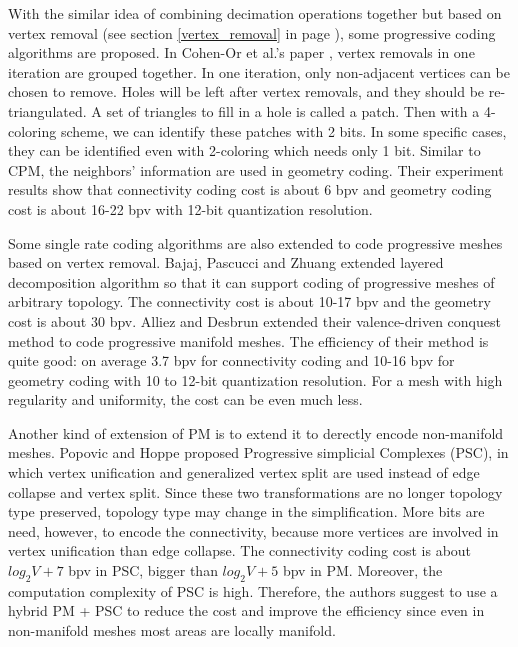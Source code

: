 \documentclass[11pt, a4paper]{report}
\begin{document}
    With the similar idea of combining decimation operations together
    but based on vertex removal (see section \ref{vertex_removal} in
    page \pageref{vertex_removal}), some progressive coding algorithms
    are proposed. In Cohen-Or et al.'s paper \cite{319358},
    vertex removals in one iteration are grouped together. In one
    iteration, only non-adjacent vertices can be chosen to remove.
    Holes will be left after vertex removals, and they should be
    re-triangulated. A set of triangles to fill in a hole is called a
    patch. Then with a 4-coloring scheme, we can identify these
    patches with 2 bits. In some specific cases, they can be
    identified even with 2-coloring which needs only 1 bit. Similar
    to CPM, the neighbors' information are used in geometry coding.
    Their experiment results show that connectivity coding cost is
    about 6 bpv and geometry coding cost is about 16-22 bpv with
    12-bit quantization resolution.

    Some single rate coding algorithms are also extended to code
    progressive meshes based on vertex removal. Bajaj, Pascucci and
    Zhuang \cite{319426} extended layered decomposition algorithm
    \cite{789628} so that it can support coding of progressive meshes
    of arbitrary topology. The connectivity cost is about 10-17 bpv
    and the geometry cost is about 30 bpv. Alliez and Desbrun
    \cite{383281} extended their valence-driven conquest
    method \cite{alliez01valencedriven}to code progressive manifold
    meshes. The efficiency of their method is quite good: on average
    3.7 bpv for connectivity coding and 10-16 bpv for geometry coding
    with 10 to 12-bit quantization resolution. For a mesh with high
    regularity and uniformity, the cost can be even much less.

    Another kind of extension of PM is to extend it to derectly encode non-manifold meshes. 
    Popovic and Hoppe \cite{258852} proposed Progressive simplicial Complexes (PSC), in
    which vertex unification and generalized vertex split are used instead of edge
    collapse and vertex split. Since these two transformations are no
    longer topology type preserved, topology type may change in the
    simplification. More bits are need, however, to encode the
    connectivity, because more vertices are involved in vertex
    unification than edge collapse. The connectivity coding cost is about $log_{2}V
    + 7$ bpv in PSC, bigger than $log_{2}V + 5$ bpv in PM. Moreover,
    the computation complexity of PSC is high. Therefore, the
    authors suggest to use a hybrid PM + PSC to reduce the cost and
    improve the efficiency since even in non-manifold meshes most areas
    are locally manifold.
    
\end{document}
